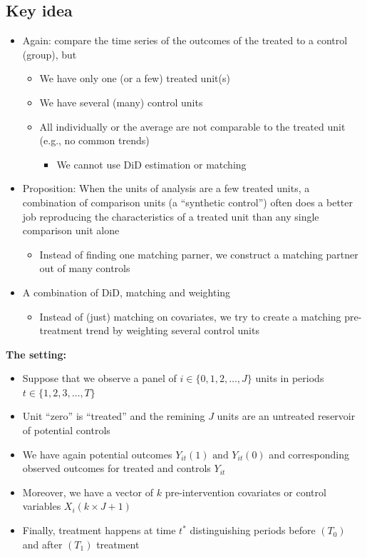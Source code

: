 \documentclass[10pt]{article}
\begin{document}
\subsection{Key idea}
\begin{itemize}
    \item Again: compare the time series of the outcomes of the treated to a control (group), but
    \begin{itemize}
        \item We have only one (or a few) treated unit(s) 
        \item We have several (many) control units 
        \item All individually or the average are not comparable to the treated unit (e.g., no common trends)
        \begin{itemize}
            \item We cannot use DiD estimation or matching 
        \end{itemize}
    \end{itemize}
    \item Proposition: When the units of analysis are a few treated units, a combination of comparison units (a ``synthetic control'') often does a better job reproducing the characteristics of a treated unit than any single comparison unit alone
    \begin{itemize}
        \item Instead of finding one matching parner, we construct a matching partner out of many controls 
    \end{itemize}
    \item A combination of DiD, matching and weighting 
    \begin{itemize}
        \item Instead of (just) matching on covariates, we try to create a matching pre-treatment trend by weighting several control units 
    \end{itemize}
\end{itemize}
\textbf{The setting:}
\begin{itemize}
    \item Suppose that we observe a panel of $i\in \{0, 1, 2, \dots, J\} $ units in periods $t \in \{1, 2, 3, \dots, T\} $
    \item Unit ``zero'' is ``treated'' and the remining $J $ units are an untreated reservoir of potential controls 
    \item We have again potential outcomes $Y_{it}(1)\text{ and }Y_{it}(0) $ and corresponding observed outcomes for treated and controls $Y_{it} $
    \item Moreover, we have a vector of $k $ pre-intervention covariates or control variables $X_i (k\times J + 1) $
    \item Finally, treatment happens at time $t^* $ distinguishing periods before $(T_0) $ and after $(T_1) $ treatment 
\end{itemize}
\end{document}
